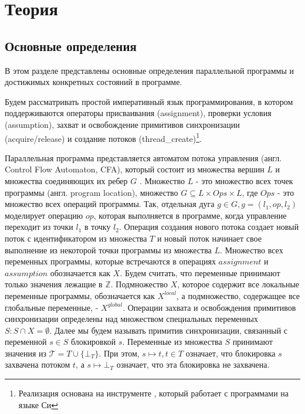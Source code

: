 \chapter{Теория}
\label{chapter_theory}

\section{Основные определения}
В этом разделе представлены основные определения параллельной программы и достижимых конкретных состояний в программе.

Будем рассматривать простой императивный язык программирования, в котором поддерживаются операторы присваивания (assignment), проверки условия (assumption), захват и освобождение примитивов синхронизации (acquire/release) и создание потоков (thread\_create)\footnote{Реализация основана на инструменте \cpachecker, который работает с программами на языке Си}.

Параллельная программа представляется автоматом потока управления (англ. Control Flow Automaton, CFA), который состоит из множества вершин $L$  и множества соединяющих их ребер $G$ .
Множество $L$ - это множество всех точек программы (англ. program location), множество $G \subseteq L \times Ops \times L$, где $Ops$ - это множество всех операций программы.
Так, отдельная дуга $g \in G, g = (l_1, op, l_2)$ моделирует операцию $op$, которая выполняется в программе, когда управление переходит из точки $l_1$ в точку $l_2$.
Операция создания нового потока создает новый поток с идентификатором из множества $T$ и новый поток начинает свое выполнение из некоторой точки программы из множества $L$.
Множество всех переменных программы, которые встречаются в операциях $assignment$ и $assumption$ обозначается как $X$.
Будем считать, что переменные принимают только значения лежащие в $\mathbb{Z}$.
Подмножество $X$, которое содержит все локальные переменные программы, обозначается как $X^{local}$, а подмножество, содержащее все глобальные переменные, -  $X^{global}$. 
Операции захвата и освобождения примитивов синхронизации определены над множеством специальных переменных $S: S \cap X = \emptyset$.
Далее мы будем называть примитив синхронизации, связанный с переменной $s \in S$ блокировкой $s$.
Переменные из множества $S$ принимают значения из $\mathcal{T}=T \cup \{\bot_T\}$.
При этом, $s \mapsto t, t \in T$ означает, что блокировка $s$ захвачена потоком $t$, а $s \mapsto \bot_T$ означает, что эта блокировка не захвачена.

